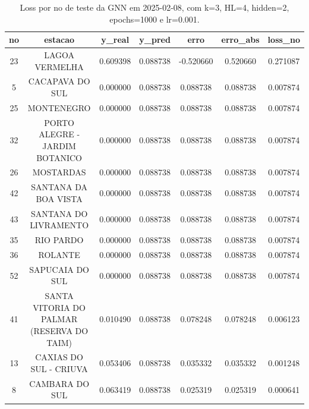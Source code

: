 \begin{table}[h]
\centering
\caption{Loss por no de teste da GNN em 2025-02-08, com k=3, HL=4, hidden=2, epochs=1000 e lr=0.001.}
\label{tab:gnn_loss_k3_hl4_h2_e1000_d20250208}
\begin{tabular}{ccccccc}
\toprule
no & estacao & y\_real & y\_pred & erro & erro\_abs & loss\_no \\
\midrule
23 & LAGOA VERMELHA & 0.609398 & 0.088738 & -0.520660 & 0.520660 & 0.271087 \\
5 & CACAPAVA DO SUL & 0.000000 & 0.088738 & 0.088738 & 0.088738 & 0.007874 \\
25 & MONTENEGRO & 0.000000 & 0.088738 & 0.088738 & 0.088738 & 0.007874 \\
32 & PORTO ALEGRE - JARDIM BOTANICO & 0.000000 & 0.088738 & 0.088738 & 0.088738 & 0.007874 \\
26 & MOSTARDAS & 0.000000 & 0.088738 & 0.088738 & 0.088738 & 0.007874 \\
42 & SANTANA DA BOA VISTA & 0.000000 & 0.088738 & 0.088738 & 0.088738 & 0.007874 \\
43 & SANTANA DO LIVRAMENTO & 0.000000 & 0.088738 & 0.088738 & 0.088738 & 0.007874 \\
35 & RIO PARDO & 0.000000 & 0.088738 & 0.088738 & 0.088738 & 0.007874 \\
36 & ROLANTE & 0.000000 & 0.088738 & 0.088738 & 0.088738 & 0.007874 \\
52 & SAPUCAIA DO SUL & 0.000000 & 0.088738 & 0.088738 & 0.088738 & 0.007874 \\
41 & SANTA VITORIA DO PALMAR (RESERVA DO TAIM) & 0.010490 & 0.088738 & 0.078248 & 0.078248 & 0.006123 \\
13 & CAXIAS DO SUL - CRIUVA & 0.053406 & 0.088738 & 0.035332 & 0.035332 & 0.001248 \\
8 & CAMBARA DO SUL & 0.063419 & 0.088738 & 0.025319 & 0.025319 & 0.000641 \\
\bottomrule
\end{tabular}
\end{table}
